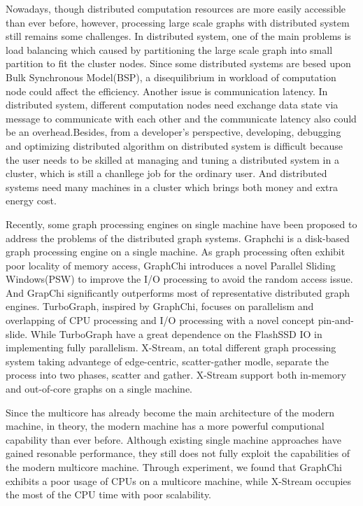 \documentclass[twocolumn,a4paper,10pt]{article}
\begin{document}
Nowadays, though distributed computation resources are more easily accessible than ever before, however, processing large scale graphs with distributed system still remains some challenges. In distributed system, one of the main problems is load balancing which caused by partitioning the large scale graph into small partition to fit the cluster nodes. Since some distributed systems are besed upon Bulk Synchronous Model(BSP), a disequilibrium in workload of computation node could affect the efficiency. Another issue is communication latency. In distributed system, different computation nodes need exchange data state via message to communicate with each other and the communicate latency also could be an overhead.Besides, 
from a developer’s perspective, developing, debugging and optimizing distributed algorithm on distributed system is difficult because the user needs to be skilled at managing and tuning a distributed system in a cluster, which is still a chanllege job for the ordinary user. And distributed systems need many machines in a cluster which brings both money and extra energy cost.\newline

Recently, some graph processing engines on single machine have been proposed to address the problems of the distributed graph systems. Graphchi is a disk-based graph processing engine on a single machine. As graph processing often exhibit poor locality of memory access, GraphChi introduces a novel Parallel Sliding Windows(PSW) to improve the I/O processing to avoid the random access issue. And GrapChi significantly outperforms most of representative distributed graph engines. TurboGraph, inspired by GraphChi, focuses on parallelism and overlapping of CPU processing and I/O processing with a novel concept pin-and-slide. While TurboGraph have a great dependence on the FlashSSD IO in implementing fully parallelism. X-Stream, an total different graph processing system taking advantege of edge-centric, scatter-gather modle, separate the process into two phases, scatter and gather. X-Stream support both in-memory and out-of-core graphs on a single machine. \newline

Since the multicore has already become the main architecture of the modern machine, in theory, the modern machine has a more powerful computional capability than ever before. Although existing single machine approaches have gained resonable performance, they still does not fully exploit the capabilities of the modern multicore machine. Through experiment, we found that GraphChi exhibits a poor usage of CPUs on a multicore machine, while X-Stream occupies the most of the CPU time with poor scalability.\newline
\end{document}
